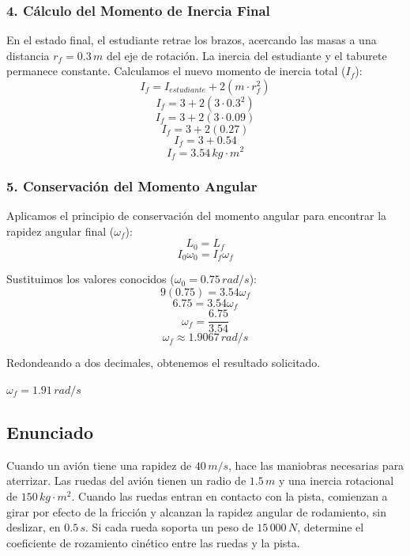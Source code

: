 \documentclass[12pt, a4paper]{article}
\begin{document}
\subsubsection*{4. Cálculo del Momento de Inercia Final}
En el estado final, el estudiante retrae los brazos, acercando las masas a una distancia $r_f = 0.3 \, \si{m}$ del eje de rotación. La inercia del estudiante y el taburete permanece constante. Calculamos el nuevo momento de inercia total ($I_f$):
$$I_f = I_{estudiante} + 2 (m \cdot r_f^2)$$
$$I_f = 3 + 2 (3 \cdot 0.3^2)$$
$$I_f = 3 + 2 (3 \cdot 0.09)$$
$$I_f = 3 + 2 (0.27)$$
$$I_f = 3 + 0.54$$
$$I_f = 3.54 \, \si{kg\cdot m^2}$$

\subsubsection*{5. Conservación del Momento Angular}
Aplicamos el principio de conservación del momento angular para encontrar la rapidez angular final ($\omega_f$):
$$L_0 = L_f$$
$$I_0 \omega_0 = I_f \omega_f$$

Sustituimos los valores conocidos ($\omega_0 = 0.75 \, \si{rad/s}$):
$$9 (0.75) = 3.54 \omega_f$$
$$6.75 = 3.54 \omega_f$$
$$\omega_f = \frac{6.75}{3.54}$$
$$\omega_f \approx 1.9067 \, \si{rad/s}$$

Redondeando a dos decimales, obtenemos el resultado solicitado.

\begin{tcolorbox}[colback=green!5!white, colframe=green!50!black, title=Respuesta Final]
\centering \Large $\omega_f = 1.91 \, \si{rad/s}$
\end{tcolorbox}

\newpage

\subsection*{Enunciado}
Cuando un avión tiene una rapidez de $40 \, \si{m/s}$, hace las maniobras necesarias para aterrizar. Las ruedas del avión tienen un radio de $1.5 \, \si{m}$ y una inercia rotacional de $150 \, \si{kg\cdot m^2}$. Cuando las ruedas entran en contacto con la pista, comienzan a girar por efecto de la fricción y alcanzan la rapidez angular de rodamiento, sin deslizar, en $0.5 \, \si{s}$. Si cada rueda soporta un peso de $15\,000 \, \si{N}$, determine el coeficiente de rozamiento cinético entre las ruedas y la pista.

\begin{center}
\end{center}
\end{document}
